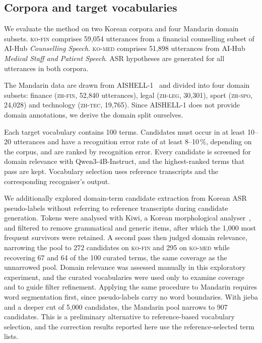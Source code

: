 \documentclass{article}
\newcommand{\corpA}{\textsc{ko-fin}}
\newcommand{\corpB}{\textsc{ko-med}}
\newcommand{\zhfin}{\textsc{zh-fin}}
\newcommand{\zhleg}{\textsc{zh-leg}}
\newcommand{\zhspo}{\textsc{zh-spo}}
\newcommand{\zhtec}{\textsc{zh-tec}}
\begin{document}
\subsection{Corpora and target vocabularies}
\label{sec:data}

We evaluate the method on two Korean corpora and four Mandarin domain subsets. \corpA{} comprises 59{,}054 utterances from a financial counselling subset of AI-Hub \emph{Counselling Speech}. \corpB{} comprises 51{,}898 utterances from AI-Hub \emph{Medical Staff and Patient Speech}. ASR hypotheses are generated for all utterances in both corpora.

The Mandarin data are drawn from AISHELL-1~\cite{bu2017aishell} and divided into four domain subsets: finance (\zhfin{}, 52{,}840 utterances), legal (\zhleg{}, 30{,}301), sport (\zhspo{}, 24{,}028) and technology (\zhtec{}, 19{,}765). Since AISHELL-1 does not provide domain annotations, we derive the domain split ourselves.

Each target vocabulary contains 100 terms. Candidates must occur in at least 10--20 utterances and have a recognition error rate of at least 8--10\,\%, depending on the corpus, and are ranked by recognition error. Every candidate is screened for domain relevance with Qwen3-4B-Instruct, and the highest-ranked terms that pass are kept. Vocabulary selection uses reference transcripts and the corresponding recogniser's output.

We additionally explored domain-term candidate extraction from Korean ASR pseudo-labels without referring to reference transcripts during candidate generation. Tokens were analysed with Kiwi, a Korean morphological analyser~\cite{lee2024kiwi}, and filtered to remove grammatical and generic items, after which the 1{,}000 most frequent survivors were retained. A second pass then judged domain relevance, narrowing the pool to 272 candidates on \corpA{} and 295 on \corpB{} while recovering 67 and 64 of the 100 curated terms, the same coverage as the unnarrowed pool. Domain relevance was assessed manually in this exploratory experiment, and the curated vocabularies were used only to examine coverage and to guide filter refinement. Applying the same procedure to Mandarin requires word segmentation first, since pseudo-labels  carry no word boundaries. With jieba and a deeper cut of 5{,}000 candidates, the Mandarin pool narrows to 907 candidates. This is a preliminary alternative to reference-based vocabulary selection, and the correction results reported here use the reference-selected term lists.
\end{document}
